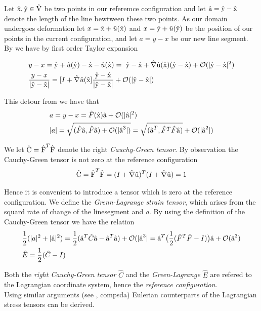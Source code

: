 Let $\text{\^{x}}, \text{\^{y}} \in \text{\^{V}}$ be two points in our referemce configuration and let $\text{\^{a}} = \text{\^{y}} - \text{\^{x}}$ denote the
length of the line bewtween these two points. As our domain undergoes deformation let 
$x = \text{\^{x}} + \hat{u}( \text{\^{x}} ) $ and $x = \text{\^{y}} + \hat{u}( \text{\^{y}} )  $ be the position of our points in the current configuration, and let $a = y - x$ be our new line segment. By \cite{Richter2016} we have by first order Taylor expansion

\begin{align*}
&y - x = \text{\^{y}} + \hat{u}(\text{\^{y}}) - \text{\^{x}} - \hat{u}(\text{\^{x}}) = \
\text{\^{y}} - \text{\^{x}} + \hat{\nabla}\text{\^{u}}(\text{\^{x}}) (\text{\^{y}} - \text{\^{x}}) 
+ \mathcal{O}(|\text{\^{y}} - \text{\^{x}} |^2) \\
&\frac{y - x}{|\text{\^{y}} - \text{\^{x}}|} = [I + \hat{\nabla}\hat{u}(\text{\^{x}} ]  
\frac{\text{\^{y}} - \text{\^{x}}}{|\text{\^{y}} - \text{\^{x}}|} + \mathcal{O}(|\text{\^{y}} - \text{\^{x}} |) 
\end{align*}

This detour from \cite{Richter2016}  we have that 
\begin{align*}
&a = y - x = \hat{F}(\text{\^{x}})\text{\^{a}} +  \mathcal{O}(|\text{\^{a}} |^2) \\
&|a| = \sqrt{ (\hat{F}\text{\^{a}},\hat{F}\text{\^{a}})+ \mathcal{O} (|\text{\^{a}}^3|)  } = 
 \sqrt{ (\text{\^{a}}^T, \hat{F}^T\hat{F}\text{\^{a}})} + \mathcal{O} (|\text{\^{a}}^2|)  
\end{align*}

We let $\text{\^{C}} = \text{\^{F}}^T \text{\^{F}}$ denote the right \textit{Cauchy-Green tensor}.
By observation the Cauchy-Green tensor is not zero at the reference configuration 
\begin{align*}
\text{\^{C}} =  \text{\^{F}}^T \text{\^{F}} = (I + \hat{\nabla} \text{\^{u}})^T (I + \hat{\nabla} \text{\^{u}}) = 1
\end{align*}

Hence it is convenient to introduce a tensor which is zero at the reference configuration. We define the \textit{Grenn-Lagrange strain tensor}, which arises from the squard rate of change of the linesegment  and \textit{a}. By using the definition of the Cauchy-Green tensor we have the relation
\begin{align*}
&\frac{1}{2}(|a|^2 + |\text{\^{a}}|^2) = \frac{1}{2}(\text{\^{a}}^T\hat{C}\text{\^{a}}
 -\text{\^{a}}^T \text{\^{a}} ) + \mathcal{O}(|\text{\^{a}}^3| = 
 \text{\^{a}}^T \big(\frac{1}{2} (\hat{F}^T \hat{F} - I) \big) \text{\^{a}} 
 + \mathcal{O}(\text{\^{a}}^3) \\
&\hat{E} = \frac{1}{2}(\hat{C} - I)
\end{align*}

Both the \textit{right Cauchy-Green tensor} $\hat{C}$ and the \textit{Green-Lagrange} $\hat{E}$ are refered to the Lagrangian coordinate system, hence the \textit{reference configuration}. \\
Using similar arguments (see \cite{Richter2016}, compsda) Eulerian counterparts of the Lagrangian stress tensors can be derived.

